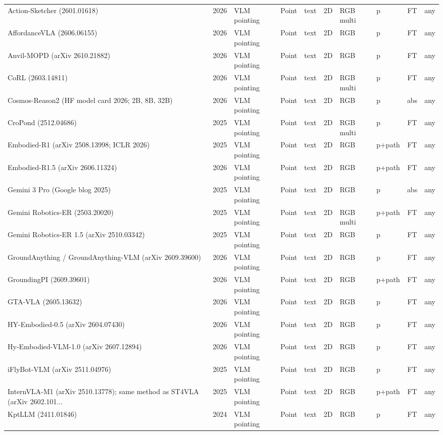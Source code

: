 {\begin{landscape}
\begin{longtable}{@{}p{4.6cm}rp{2.0cm}lllllcl@{}}
Action-Sketcher (2601.01618) & 2026 & VLM pointing & Point & text & 2D & RGB multi & p & FT & any \\
AffordanceVLA (2606.06155) & 2026 & VLM pointing & Point & text & 2D & RGB & p & FT & any \\
Anvil-MOPD (arXiv 2610.21882) & 2026 & VLM pointing & Point & text & 2D & RGB & p & FT & any \\
CoRL (2603.14811) & 2026 & VLM pointing & Point & text & 2D & RGB multi & p & FT & any \\
Cosmos-Reason2 (HF model card 2026; 2B, 8B, 32B) & 2026 & VLM pointing & Point & text & 2D & RGB & p & abs & any \\
CroPond (2512.04686) & 2025 & VLM pointing & Point & text & 2D & RGB multi & p & FT & any \\
Embodied-R1 (arXiv 2508.13998; ICLR 2026) & 2025 & VLM pointing & Point & text & 2D & RGB & p+path & FT & any \\
Embodied-R1.5 (arXiv 2606.11324) & 2026 & VLM pointing & Point & text & 2D & RGB & p+path & FT & any \\
Gemini 3 Pro (Google blog 2025) & 2025 & VLM pointing & Point & text & 2D & RGB & p & abs & any \\
Gemini Robotics-ER (2503.20020) & 2025 & VLM pointing & Point & text & 2D & RGB multi & p+path & FT & any \\
Gemini Robotics-ER 1.5 (arXiv 2510.03342) & 2025 & VLM pointing & Point & text & 2D & RGB & p & FT & any \\
GroundAnything / GroundAnything-VLM (arXiv 2609.39600) & 2026 & VLM pointing & Point & text & 2D & RGB & p & FT & any \\
GroundingPI (2609.39601) & 2026 & VLM pointing & Point & text & 2D & RGB & p+path & FT & any \\
GTA-VLA (2605.13632) & 2026 & VLM pointing & Point & text & 2D & RGB & p & FT & any \\
HY-Embodied-0.5 (arXiv 2604.07430) & 2026 & VLM pointing & Point & text & 2D & RGB & p & FT & any \\
Hy-Embodied-VLM-1.0 (arXiv 2607.12894) & 2026 & VLM pointing & Point & text & 2D & RGB & p & FT & any \\
iFlyBot-VLM (arXiv 2511.04976) & 2025 & VLM pointing & Point & text & 2D & RGB & p & FT & any \\
InternVLA-M1 (arXiv 2510.13778); same method as ST4VLA (arXiv 2602.101... & 2025 & VLM pointing & Point & text & 2D & RGB & p+path & FT & any \\
KptLLM (2411.01846) & 2024 & VLM pointing & Point & text & 2D & RGB & p & FT & any \\

\end{longtable}
\end{landscape}}
